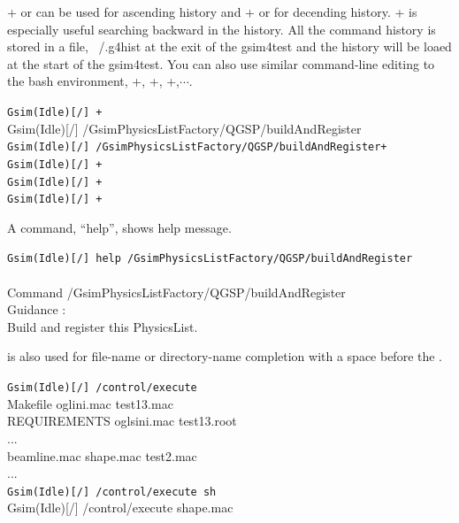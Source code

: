 \documentclass[a4paper,12pt]{article}
\begin{document}
 + or \keytop{$\uparrow$} can be used for
 ascending history and + or \keytop{$\downarrow$}
 for decending history. + is especially useful
 searching  backward in the history. All the command history is stored
 in a file, ~/.g4hist at the exit of the gsim4test and the history will 
 be loaed at the start of the gsim4test.
 You can also use similar command-line editing to the bash environment,
 +, +,
 +,$\cdots$. 
 \begin{screen}
  {\tt Gsim(Idle)[/] +}\\
  {\small Gsim(Idle)[/] /GsimPhysicsListFactory/QGSP/buildAndRegister}\\
  {\tt Gsim(Idle)[/] /GsimPhysicsListFactory/QGSP/buildAndRegister+}\\
  {\tt Gsim(Idle)[/] +}\\
  {\tt Gsim(Idle)[/] +}\\
  {\tt Gsim(Idle)[/] +}
 \end{screen}

 A command, ``help'', shows help message.
 \begin{screen}
  {\tt Gsim(Idle)[/] help /GsimPhysicsListFactory/QGSP/buildAndRegister\keytop{\return}}\\
\\
Command /GsimPhysicsListFactory/QGSP/buildAndRegister\\
Guidance :\\
Build and register this PhysicsList.\\
 \end{screen}

  is also used for file-name or directory-name completion
 with a space before the . 
 \begin{screen}
  {\tt Gsim(Idle)[/] /control/execute}\\
  {\small Makefile            oglini.mac          test13.mac\\
  REQUIREMENTS        oglsini.mac         test13.root\\
  ...\\
  beamline.mac        shape.mac           test2.mac\\
  ...
  }\\
  {\tt Gsim(Idle)[/] /control/execute sh}\\
  {\small Gsim(Idle)[/] /control/execute shape.mac}
 \end{screen}
\end{document}
